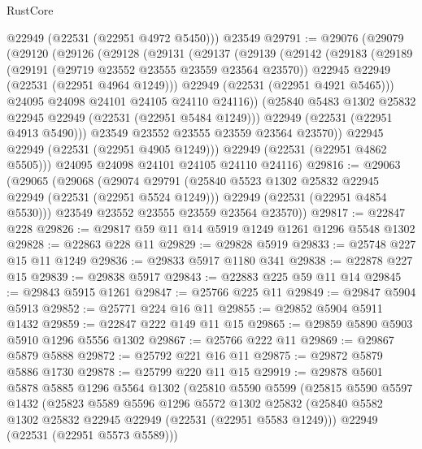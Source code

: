 \begin{lexlean}{RustCore}
\begin{coremodule}
      @22949
      (@22531 (@22951 @4972 @5450)))
    @23549
@29791 := @29076
    (@29079
      (@29120
        (@29126
          (@29128
            (@29131
              (@29137
                (@29139
                  (@29142
                    (@29183
                      (@29189
                        (@29191 (@29719 @23552 @23555 @23559 @23564 @23570))
                        @22945
                        @22949
                        (@22531 (@22951 @4964 @1249)))
                      @22949
                      (@22531 (@22951 @4921 @5465)))
                    @24095
                    @24098
                    @24101
                    @24105
                    @24110
                    @24116))
                (@25840 @5483 @1302 @25832 @22945 @22949 (@22531 (@22951 @5484 @1249)))
                @22949
                (@22531 (@22951 @4913 @5490)))
              @23549
              @23552
              @23555
              @23559
              @23564
              @23570))
          @22945
          @22949
          (@22531 (@22951 @4905 @1249)))
        @22949
        (@22531 (@22951 @4862 @5505)))
      @24095
      @24098
      @24101
      @24105
      @24110
      @24116)
@29816 := @29063
    (@29065
      (@29068
        (@29074
          @29791
          (@25840 @5523 @1302 @25832 @22945 @22949 (@22531 (@22951 @5524 @1249)))
          @22949
          (@22531 (@22951 @4854 @5530)))
        @23549
        @23552
        @23555
        @23559
        @23564
        @23570))
@29817 := @22847 @228
@29826 := @29817 @59 @11 @14 @5919 @1249 @1261 @1296 @5548 @1302
@29828 := @22863 @228 @11
@29829 := @29828 @5919
@29833 := @25748 @227 @15 @11 @1249
@29836 := @29833 @5917 @1180 @341
@29838 := @22878 @227 @15
@29839 := @29838 @5917
@29843 := @22883 @225 @59 @11 @14
@29845 := @29843 @5915 @1261
@29847 := @25766 @225 @11
@29849 := @29847 @5904 @5913
@29852 := @25771 @224 @16 @11
@29855 := @29852 @5904 @5911 @1432
@29859 := @22847 @222 @149 @11 @15
@29865 := @29859 @5890 @5903 @5910 @1296 @5556 @1302
@29867 := @25766 @222 @11
@29869 := @29867 @5879 @5888
@29872 := @25792 @221 @16 @11
@29875 := @29872 @5879 @5886 @1730
@29878 := @25799 @220 @11 @15
@29919 := @29878
    @5601
    @5878
    @5885
    @1296
    @5564
    @1302
    (@25810
      @5590
      @5599
      (@25815
        @5590
        @5597
        @1432
        (@25823
          @5589
          @5596
          @1296
          @5572
          @1302
          @25832
          (@25840 @5582 @1302 @25832 @22945 @22949 (@22531 (@22951 @5583 @1249)))
          @22949
          (@22531 (@22951 @5573 @5589)))

\end{coremodule}
\end{lexlean}

